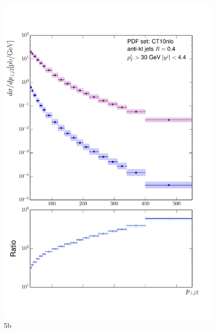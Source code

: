 	\begin{figure}[h]
		\centering
		\includegraphics[width=0.8\linewidth]{Figures/ATLAS_Z_100TeV_5b.pdf}
		\caption{5b}
		\label{fig:emissionsites}
	\end{figure}

